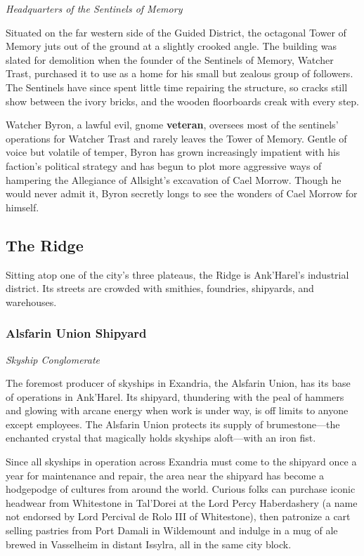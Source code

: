 \documentclass[letterpaper, 11pt, bg=full, twocolumn]{dndbook}
\begin{document}
\textit{Headquarters of the Sentinels of Memory}

Situated on the far western side of the Guided District, the octagonal Tower of Memory juts out of the ground at a slightly crooked angle. The building was slated for demolition when the founder of the Sentinels of Memory, Watcher Trast, purchased it to use as a home for his small but zealous group of followers. The Sentinels have since spent little time repairing the structure, so cracks still show between the ivory bricks, and the wooden floorboards creak with every step.

Watcher Byron, a lawful evil, gnome \textbf{veteran}, oversees most of the sentinels' operations for Watcher Trast and rarely leaves the Tower of Memory. Gentle of voice but volatile of temper, Byron has grown increasingly impatient with his faction's political strategy and has begun to plot more aggressive ways of hampering the Allegiance of Allsight's excavation of Cael Morrow. Though he would never admit it, Byron secretly longs to see the wonders of Cael Morrow for himself.

\subsection{The Ridge}

Sitting atop one of the city's three plateaus, the Ridge is Ank'Harel's industrial district. Its streets are crowded with smithies, foundries, shipyards, and warehouses.

\subsubsection{Alsfarin Union Shipyard}

\textit{Skyship Conglomerate}

The foremost producer of skyships in Exandria, the Alsfarin Union, has its base of operations in Ank'Harel. Its shipyard, thundering with the peal of hammers and glowing with arcane energy when work is under way, is off limits to anyone except employees. The Alsfarin Union protects its supply of brumestone---the enchanted crystal that magically holds skyships aloft---with an iron fist.

Since all skyships in operation across Exandria must come to the shipyard once a year for maintenance and repair, the area near the shipyard has become a hodgepodge of cultures from around the world. Curious folks can purchase iconic headwear from Whitestone in Tal'Dorei at the Lord Percy Haberdashery (a name not endorsed by Lord Percival de Rolo III of Whitestone), then patronize a cart selling pastries from Port Damali in Wildemount and indulge in a mug of ale brewed in Vasselheim in distant Issylra, all in the same city block.
\end{document}
